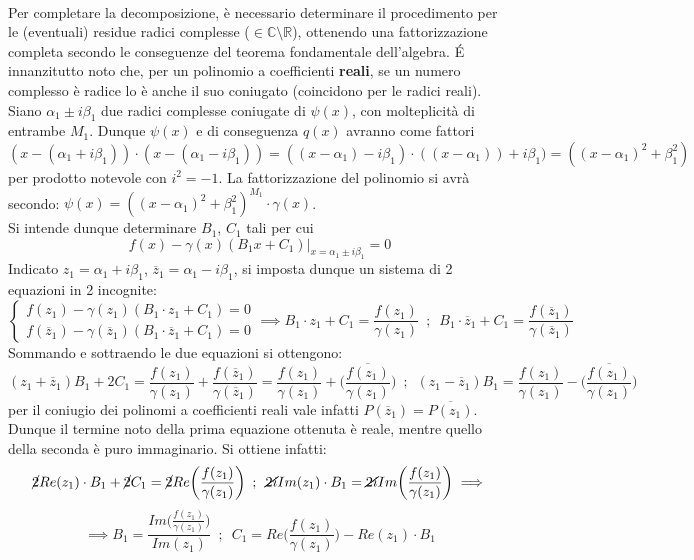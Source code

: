 \documentclass[10pt]{article}
\theoremstyle{plain}
\begin{document}
\\Per completare la decomposizione, è necessario determinare il procedimento per le (eventuali) residue radici complesse ($\in \mathbb{C} \setminus \mathbb{R}$), ottenendo una fattorizzazione completa secondo le conseguenze del teorema fondamentale dell'algebra.
\'E innanzitutto noto che, per un polinomio a coefficienti \textbf{reali}, se un numero complesso è radice lo è anche il suo coniugato (coincidono per le radici reali).
\\Siano $\alpha_1 \pm i \beta_1$ due radici complesse coniugate di $\psi(x)$, con molteplicità di entrambe $M_1$. Dunque $\psi(x)$ e di conseguenza $q(x)$ avranno come fattori $(x - (\alpha_1 + i \beta_1)) \cdot (x - (\alpha_1 - i \beta_1)) = ((x - \alpha_1) - i \beta_1) \cdot ((x - \alpha_1)) + i \beta_1) = ((x- \alpha_1)^2 + \beta_1^2)$ per prodotto notevole con $i^2 = -1$. La fattorizzazione del polinomio si avrà secondo: $\psi(x) = ((x- \alpha_1)^2 + \beta_1^2)^{M_1}\cdot \gamma(x)$.
\\Si intende dunque determinare $B_1$, $C_1$ tali per cui \[f(x) - \gamma(x)(B_1 x + C_1) \big|_{x = \alpha_1 \pm i \beta_1} = 0\]
Indicato $z_1 = \alpha_1 + i \beta_1$, $\overline{z}_1 = \alpha_1 - i \beta_1$, si imposta dunque un sistema di 2 equazioni in 2 incognite:
\[\begin{cases}
   f(z_1) - \gamma(z_1)(B_1 \cdot z_1 + C_1) = 0\\
   f(\overline{z}_1) - \gamma(\overline{z}_1)(B_1 \cdot \overline{z}_1 + C_1) = 0
\end{cases} \implies
    B_1 \cdot z_1 + C_1 = \frac{f(z_1)}{\gamma(z_1)} \enspace ; \enspace B_1 \cdot \overline{z}_1 + C_1 = \frac{f(\overline{z}_1)}{\gamma(\overline{z}_1)}\]
Sommando e sottraendo le due equazioni si ottengono:
\[(z_1 + \overline{z}_1)B_1 + 2 C_1 = \frac{f(z_1)}{\gamma(z_1)} + \frac{f(\overline{z}_1)}{\gamma(\overline{z}_1)} = \frac{f(z_1)}{\gamma(z_1)} + \overline{\bigg(\frac{f(z_1)}{\gamma(z_1)}\bigg)} \enspace ; \enspace (z_1 - \overline{z}_1)B_1 = \frac{f(z_1)}{\gamma(z_1)} - \overline{\bigg(\frac{f(z_1)}{\gamma(z_1)}\bigg)}\]
per il coniugio dei polinomi a coefficienti reali vale infatti $P(\overline{z}_1) = \overline{P(z_1)}$. Dunque il termine noto della prima equazione ottenuta è reale, mentre quello della seconda è puro immaginario. Si ottiene infatti:
\[\cancel{2}Re(z_1) \cdot B_1 + \cancel{2} C_1 = \cancel{2} Re \bigg(\frac{f(z_1)}{\gamma(z_1)}\bigg) \enspace ; \enspace \cancel{2i}Im(z_1) \cdot B_1 = \cancel{2i} Im \bigg(\frac{f(z_1)}{\gamma(z_1)}\bigg) \implies\] 
\[\implies B_1 = \frac{Im \bigg(\frac{f(z_1)}{\gamma(z_1)}\bigg)}{Im(z_1)} \enspace ; \enspace C_1 = Re \bigg(\frac{f(z_1)}{\gamma(z_1)}\bigg) - Re(z_1) \cdot B_1\]
\end{document}
